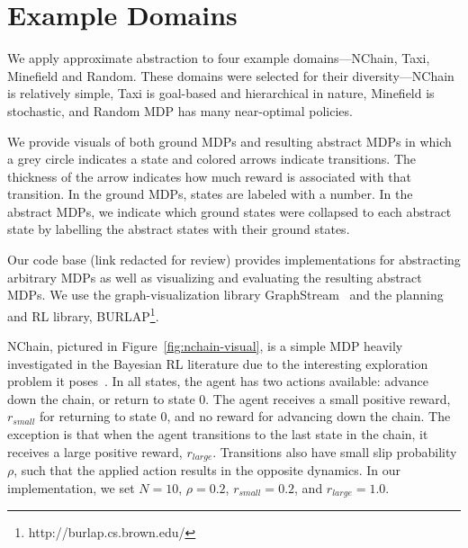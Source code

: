 \section{Example Domains}
We apply approximate abstraction to four example domains---NChain, Taxi, Minefield and Random. These domains were selected for their diversity---NChain is relatively simple, Taxi is goal-based and hierarchical in nature, Minefield is stochastic, and Random MDP has many near-optimal policies.

We provide visuals of both ground \acp{MDP} and resulting abstract \acp{MDP} in which a grey circle indicates a state and colored arrows indicate transitions. The thickness of the arrow indicates how much reward is associated with that transition. In the ground \acp{MDP}, states are labeled with a number. In the abstract \acp{MDP}, we indicate which ground states were collapsed to each abstract state by labelling the abstract states with their ground states. %

Our code base (link redacted for review) provides implementations for abstracting arbitrary \acp{MDP} as well as visualizing and evaluating the resulting abstract \acp{MDP}. We use the graph-visualization library GraphStream~\cite{graphstream} and the planning and \ac{RL} library, BURLAP\footnote{http://burlap.cs.brown.edu/}.


NChain, pictured in Figure~\ref{fig:nchain-visual}, is a simple MDP heavily investigated in the Bayesian RL literature due to the interesting exploration problem it poses~\cite{dearden1998bayesian}. In all states, the agent has two actions available: advance down the chain, or return to state 0. The agent receives a small positive reward, $r_{small}$ for returning to state 0, and no reward for advancing down the chain. The exception is that when the agent transitions to the last state in the chain, it receives a large positive reward, $r_{large}$. Transitions also have small slip probability $\rho$, such that the applied action results in the opposite dynamics. In our implementation, we set $N=10$, $\rho=0.2$, $r_{small} = 0.2$, and $r_{large} = 1.0$.


